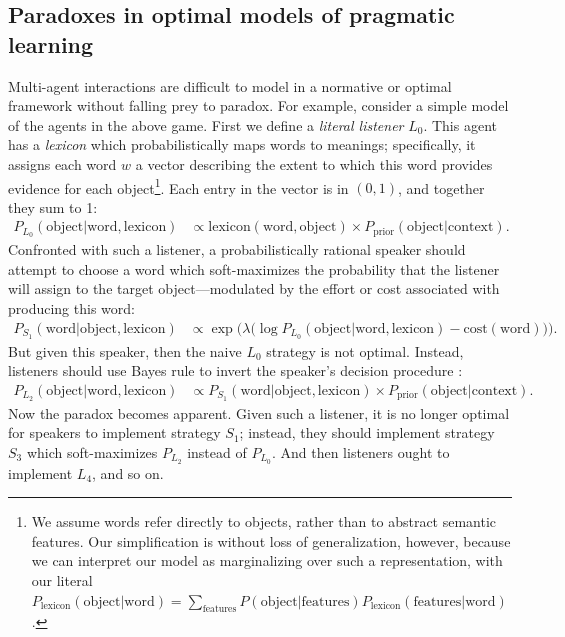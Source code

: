 \documentclass{article} %
\newcommand{\word}{\text{word}}
\newcommand{\obj}{\text{object}}
\newcommand{\lex}{\text{lexicon}}
\newcommand{\prior}{P_{\text{prior}}(\obj | \text{context})}
\begin{document}
\subsection{Paradoxes in optimal models of pragmatic learning}
Multi-agent interactions are difficult to model in a normative or optimal framework without falling prey to paradox. For example, consider a simple model of the agents in the above game. First we define a \textit{literal listener} $L_0$. This agent has a \textit{lexicon} which probabilistically maps words to meanings; specifically, it assigns each word $w$ a vector describing the extent to which this word provides evidence for each object\footnote{We assume words refer directly to objects, rather than to abstract semantic features. Our simplification is without loss of generalization, however, because we can interpret our model as marginalizing over such a representation, with our literal $P_\lex(\obj | \word) = \sum_\text{features} P(\obj | \text{features}) P_\lex(\text{features} | \word)$.}. Each entry in the vector is in $(0, 1)$, and together they sum to 1:
\begin{align*}
P_{L_0}(\obj | \word, \lex) &\propto \lex(\word, \obj) \times \prior.
\end{align*}
Confronted with such a listener, a probabilistically rational speaker should attempt to choose a word which soft-maximizes the probability that the listener will assign to the target object---modulated by the effort or cost associated with producing this word:
\begin{align*}
P_{S_1}(\word | \obj, \lex) &\propto \exp\Big(\lambda \big(\log P_{L_0}(\obj | \word, \lex) - \text{cost}(\word)\big)\Big).
\end{align*}
But given this speaker, then the naive $L_0$ strategy is not optimal. Instead, listeners should use Bayes rule to invert the speaker's decision procedure \cite{frank2012}:
\begin{align*}
P_{L_2}(\obj | \word, \lex) &\propto P_{S_1}(\word | \obj, \lex) \times \prior.
\end{align*}
Now the paradox becomes apparent. Given such a listener, it is no longer optimal for speakers to implement strategy $S_1$; instead, they should implement strategy $S_3$ which soft-maximizes $P_{L_2}$ instead of $P_{L_0}$. And then listeners ought to implement $L_4$, and so on.
\end{document}
